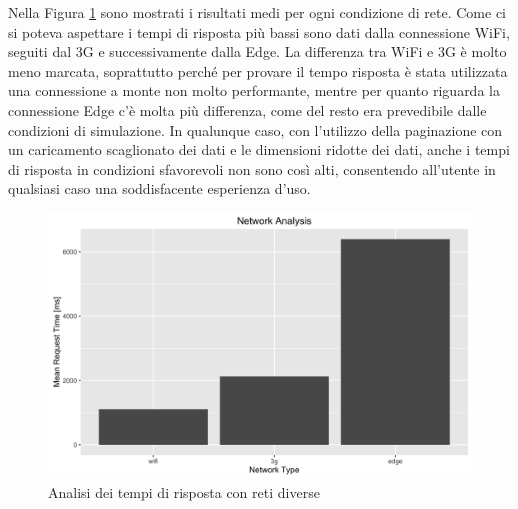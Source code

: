 Nella Figura \ref{fig:network-time-analysis} sono mostrati i risultati medi per ogni condizione di rete. Come ci si poteva aspettare i tempi di risposta più bassi sono dati dalla connessione WiFi, seguiti dal 3G e successivamente dalla Edge. La differenza tra WiFi e 3G è molto meno marcata, soprattutto perché per provare il tempo risposta è stata utilizzata una connessione a monte non molto performante, mentre per quanto riguarda la connessione Edge c'è molta più differenza, come del resto era prevedibile dalle condizioni di simulazione. In qualunque caso, con l'utilizzo della paginazione con un caricamento scaglionato dei dati e le dimensioni ridotte dei dati, anche i tempi di risposta in condizioni sfavorevoli non sono così alti, consentendo all'utente in qualsiasi caso una soddisfacente esperienza d'uso.

\begin{figure}[ht]
	\centering
	\includegraphics[width=\textwidth]{7-performance/Immagini/network_time_analysis.png}
	\caption{Analisi dei tempi di risposta con reti diverse}\label{fig:network-time-analysis}
\end{figure}